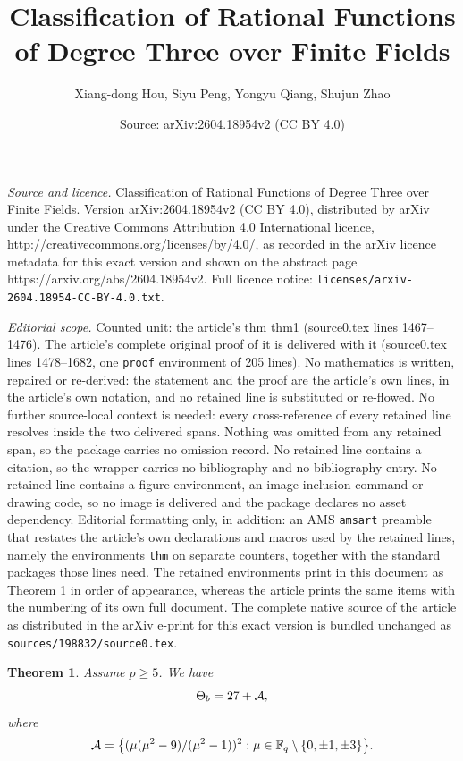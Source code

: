 \documentclass[10pt,a4paper]{amsart}
\title{Classification of Rational Functions of Degree Three over Finite Fields}
\author{Xiang-dong Hou, Siyu Peng, Yongyu Qiang, Shujun Zhao}
\date{Source: arXiv:2604.18954v2 (CC BY 4.0)}
\newtheorem{thm}{Theorem}
\newcommand{\f}{\Bbb F}
\begin{document}
\maketitle

\noindent\emph{Source and licence.} Classification of Rational Functions of Degree Three over Finite Fields. Version arXiv:2604.18954v2 (CC BY 4.0), distributed by arXiv under the Creative Commons Attribution 4.0 International licence, http://creativecommons.org/licenses/by/4.0/, as recorded in the arXiv licence metadata for this exact version and shown on the abstract page https://arxiv.org/abs/2604.18954v2. Full licence notice: \texttt{licenses/arxiv-2604.18954-CC-BY-4.0.txt}.\par\smallskip

\noindent\textit{Editorial scope.} Counted unit: the article's thm thm1 (source0.tex lines 1467--1476). The article's complete original proof of it is delivered with it (source0.tex lines 1478--1682, one \texttt{proof} environment of 205 lines). No mathematics is written, repaired or re-derived: the statement and the proof are the article's own lines, in the article's own notation, and no retained line is substituted or re-flowed.  No further source-local context is needed: every cross-reference of every retained line resolves inside the two delivered spans.  Nothing was omitted from any retained span, so the package carries no omission record.  No retained line contains a citation, so the wrapper carries no bibliography and no bibliography entry.  No retained line contains a figure environment, an image-inclusion command or drawing code, so no image is delivered and the package declares no asset dependency.  Editorial formatting only, in addition: an AMS \texttt{amsart} preamble that restates the article's own declarations and macros used by the retained lines, namely the environments \texttt{thm} on separate counters, together with the standard packages those lines need.  The retained environments print in this document as Theorem 1 in order of appearance, whereas the article prints the same items with the numbering of its own full document.  The complete native source of the article as distributed in the arXiv e-print for this exact version is bundled unchanged as \texttt{sources/198832/source0.tex}.
\begin{thm}\label{thm1}
Assume $p\ge 5$. We have 
\[
\Theta_{\rm b}=27+\mathcal A,
\]
where
\[
\mathcal A=\bigl\{(\mu(\mu^2-9)/(\mu^2-1))^2: \mu\in\f_q\setminus\{0,\pm1,\pm3\}\bigr\}.
\]
\end{thm}
\end{document}
